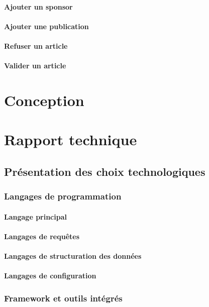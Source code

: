\documentclass[a4paper,11pt]{report}
\begin{document}
\subsection{Ajouter un sponsor}
\subsection{Ajouter une publication}
\subsection{Refuser un article}
\subsection{Valider un article}

\part{Conception}

\part{Rapport technique}

\chapter{Présentation des choix technologiques}
\section{Langages de programmation}
\subsection{Langage principal}
\subsection{Langages de requêtes}
\subsection{Langages de structuration des données}
\subsection{Langages de configuration}
\section{Framework et outils intégrés}
\end{document}
